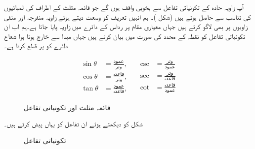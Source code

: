 آپ  زاویہ حادہ کے تکونیاتی تفاعل سے بخوبی واقف ہوں گے جو قائمہ مثلث کے اطراف کی لمبائیوں کی تناسب سے حاصل ہوتے ہیں (شکل )۔ ہم انہیں تعریف کو وسعت دیتے ہوئے  زاویہ منفرجہ اور منفی زاویوں پر بھی لاگو کرتے ہیں جہاں معیاری مقام پر رداس  کے دائرے میں زاویہ پایا جاتا ہے۔ہم اب ان تکونیاتی تفاعل کو نقطہ  کے محدد کی صورت میں بیان کرتے ہیں جہاں مبدا سے خارج ہوتا ہوا شعاع دائرے کو  پر قطع کرتا ہے۔
\begin{figure}
\centering
\begin{minipage}[b][][b]{0.3\textwidth}
\centering
{}
\end{minipage}\hfill
\begin{minipage}[b][][b]{0.66\textwidth}
\begin{gather*}
\begin{aligned}
\sin \theta&=\tfrac{\text{عمود}}{\text{وتر}},\\
\cos \theta&=\tfrac{\text{قاعدہ}}{\text{وتر}},\\
\tan \theta&=\tfrac{\text{عمود}}{\text{قاعدہ}},
\end{aligned}\quad
\begin{aligned}
\csc&=\tfrac{\text{وتر}}{\text{عمود}}\\
\sec&=\tfrac{\text{وتر}}{\text{قاعدہ}}\\
\cot&=\tfrac{\text{قاعدہ}}{\text{عمود}}
\end{aligned}
\end{gather*}
\end{minipage}%
\caption{قائمہ مثلث اور تکونیاتی تفاعل}
\label{شکل_ابتدا_قائمہ_مثلث}
\end{figure}

شکل  کو دیکھتے ہوئے ان تفاعل کو یہاں پیش کرتے ہیں۔
\begin{figure}
\centering
{}
\caption{تکونیاتی تفاعل}
\label{شکل_ابتدا_تفاعل_تکونیاتی}
\end{figure}
